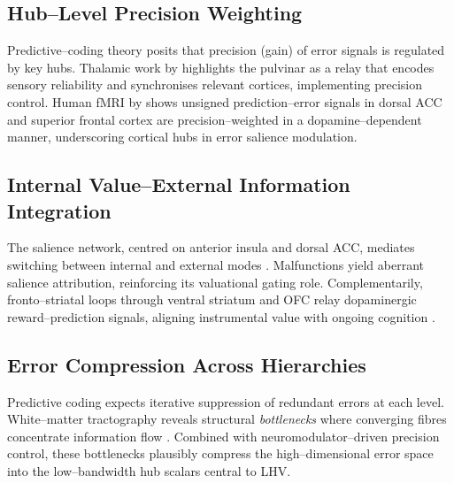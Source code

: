 \documentclass[11pt]{article}
\begin{document}
\subsection{Hub--Level Precision Weighting}
Predictive--coding theory posits that precision (gain) of error signals is regulated by key hubs. Thalamic work by \citet{kanai2015} highlights the pulvinar as a relay that encodes sensory reliability and synchronises relevant cortices, implementing precision control. Human fMRI by \citet{hauser2018} shows unsigned prediction--error signals in dorsal ACC and superior frontal cortex are precision--weighted in a dopamine--dependent manner, underscoring cortical hubs in error salience modulation.

\subsection{Internal Value--External Information Integration}
The salience network, centred on anterior insula and dorsal ACC, mediates switching between internal and external modes \citep{menon2023}. Malfunctions yield aberrant salience attribution, reinforcing its valuational gating role. Complementarily, fronto--striatal loops through ventral striatum and OFC relay dopaminergic reward--prediction signals, aligning instrumental value with ongoing cognition \citep{li2021}.

\subsection{Error Compression Across Hierarchies}
Predictive coding expects iterative suppression of redundant errors at each level. White--matter tractography reveals structural \emph{bottlenecks} where converging fibres concentrate information flow \citep{weiller2025}. Combined with neuromodulator--driven precision control, these bottlenecks plausibly compress the high--dimensional error space into the low--bandwidth hub scalars central to LHV.
\end{document}
